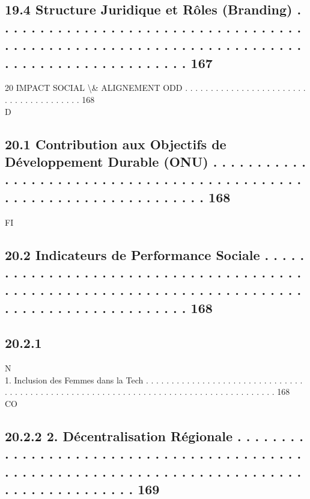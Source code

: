 \documentclass[12pt,landscape,a4paper]{article}
\begin{document}
\subsection{19.4    Structure Juridique et Rôles (Branding) . . . . . . . . . . . . . . . . . . . . . . . . . . . . . . . . . . . . . . . . . . . . . . . . . . . . . . . . . . . . . . . . . . . . . . . . . . . . . . . . . . . . . . . . . . 167}
\vspace{0.5em}
20    IMPACT SOCIAL \textbackslash{}& ALIGNEMENT ODD . . . . . . . . . . . . . . . . . . . . . . . . . . . . . . . . . . . . . . . 168\\
\vspace{0.5em}
\vspace{0.5em}
\vspace{0.5em}
\vspace{0.5em}
D\\
\subsection{20.1    Contribution aux Objectifs de Développement Durable (ONU) . . . . . . . . . . . . . . . . . . . . . . . . . . . . . . . . . . . . . . . . . . . . . . . . . . . . . . . . . . . . . . . . . . . . 168}
\vspace{0.5em}
\vspace{0.5em}
\vspace{0.5em}
\vspace{0.5em}
FI\\
\subsection{20.2    Indicateurs de Performance Sociale . . . . . . . . . . . . . . . . . . . . . . . . . . . . . . . . . . . . . . . . . . . . . . . . . . . . . . . . . . . . . . . . . . . . . . . . . . . . . . . . . . . . . . . . . . . . . . 168}
\subsection{20.2.1}
N\\
1. Inclusion des Femmes dans la Tech . . . . . . . . . . . . . . . . . . . . . . . . . . . . . . . . . . . . . . . . . . . . . . . . . . . . . . . . . . . . . . . . . . . . . . . . . . . . . . . . . . . . 168\\
CO\\
\subsection{20.2.2             2. Décentralisation Régionale . . . . . . . . . . . . . . . . . . . . . . . . . . . . . . . . . . . . . . . . . . . . . . . . . . . . . . . . . . . . . . . . . . . . . . . . . . . . . . . . . . . . . . . . . . . 169}
\end{document}
